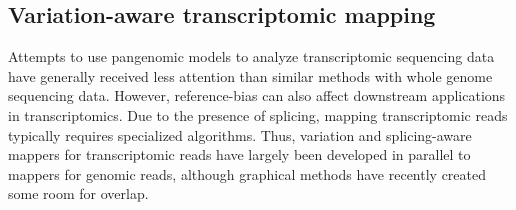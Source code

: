 

    



\subsection{Variation-aware transcriptomic mapping}

Attempts to use pangenomic models to analyze transcriptomic sequencing data have generally received less attention than similar methods with whole genome sequencing data.
However, reference-bias can also affect downstream applications in transcriptomics.
Due to the presence of splicing, mapping transcriptomic reads typically requires specialized algorithms.
Thus, variation and splicing-aware mappers for transcriptomic reads have largely been developed in parallel to mappers for genomic reads, although graphical methods have recently created some room for overlap.

